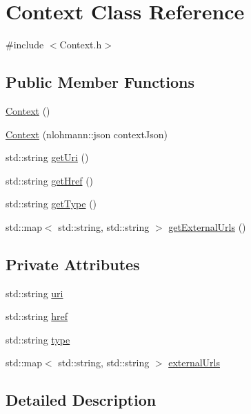 \hypertarget{class_context}{}\section{Context Class Reference}
\label{class_context}


{\ttfamily \#include $<$Context.\+h$>$}

\subsection*{Public Member Functions}
\begin{DoxyCompactItemize}
\item 
\mbox{\hyperlink{class_context_a652cdcd2eedc8dbd9110bd284c5d5cf0}{Context}} ()
\item 
\mbox{\hyperlink{class_context_a7d464dcaf72102d84730800229fa9d26}{Context}} (nlohmann\+::json context\+Json)
\item 
std\+::string \mbox{\hyperlink{class_context_a1c6d50bfa9ffc1311d86e54614644002}{get\+Uri}} ()
\item 
std\+::string \mbox{\hyperlink{class_context_a67a371fecb291b35fb59a86d402cdc27}{get\+Href}} ()
\item 
std\+::string \mbox{\hyperlink{class_context_a3139e75a0ecea9baaf7b2f00fb49347d}{get\+Type}} ()
\item 
std\+::map$<$ std\+::string, std\+::string $>$ \mbox{\hyperlink{class_context_a60926513d1fe454e0d2eed5075b3670a}{get\+External\+Urls}} ()
\end{DoxyCompactItemize}
\subsection*{Private Attributes}
\begin{DoxyCompactItemize}
\item 
std\+::string \mbox{\hyperlink{class_context_a445ae3f5c89ae990daa476a82f81c7b1}{uri}}
\item 
std\+::string \mbox{\hyperlink{class_context_ac95f2e8776510d2525cd26416a788cd9}{href}}
\item 
std\+::string \mbox{\hyperlink{class_context_a1a213fba0a70195f2f11b0dad9071675}{type}}
\item 
std\+::map$<$ std\+::string, std\+::string $>$ \mbox{\hyperlink{class_context_aa4fcf31c4906efd9e107555225a262db}{external\+Urls}}
\end{DoxyCompactItemize}


\subsection{Detailed Description}


